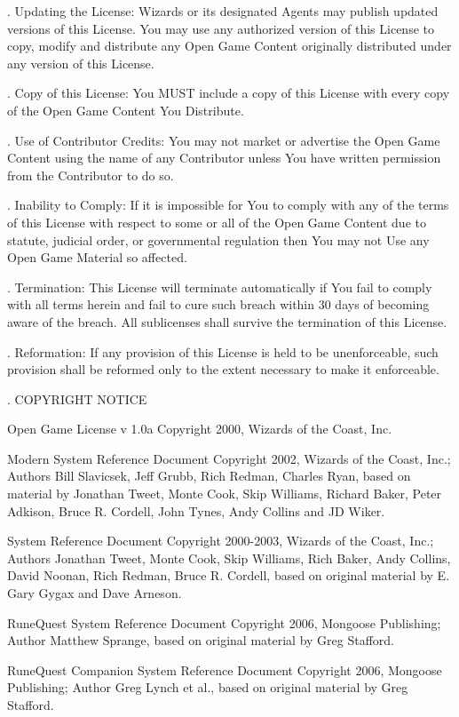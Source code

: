 \begin{scriptsize}
. Updating the License: Wizards or its designated Agents may publish updated versions of this License. You may use any authorized version of this License to copy, modify and distribute any Open Game Content originally distributed under any version of this License.

. Copy of this License: You MUST include a copy of this License with every copy of the Open Game Content You Distribute.

. Use of Contributor Credits: You may not market or advertise the Open Game Content using the name of any Contributor unless You have written permission from the Contributor to do so.

. Inability to Comply: If it is impossible for You to comply with any of the terms of this License with respect to some or all of the Open Game Content due to statute, judicial order, or governmental regulation then You may not Use any Open Game Material so affected.

. Termination: This License will terminate automatically if You fail to comply with all terms herein and fail to cure such breach within 30 days of becoming aware of the breach. All sublicenses shall survive the termination of this License.

. Reformation: If any provision of this License is held to be unenforceable, such provision shall be reformed only to the extent necessary to make it enforceable.

. COPYRIGHT NOTICE

\noindent Open Game License v 1.0a Copyright 2000, Wizards of the Coast, Inc.

\noindent Modern System Reference Document Copyright 2002, Wizards of the Coast, Inc.; Authors Bill Slavicsek, Jeff Grubb, Rich Redman, Charles Ryan, based on material by Jonathan Tweet, Monte Cook, Skip Williams, Richard Baker, Peter Adkison, Bruce R. Cordell, John Tynes, Andy Collins and JD Wiker.

\noindent System Reference Document Copyright 2000-2003, Wizards of the Coast, Inc.; Authors Jonathan Tweet, Monte Cook, Skip Williams, Rich Baker, Andy Collins, David Noonan, Rich Redman, Bruce R. Cordell, based on original material by E. Gary Gygax and Dave Arneson.

\noindent RuneQuest System Reference Document Copyright 2006, Mongoose Publishing; Author Matthew Sprange, based on original material by Greg Stafford.

\noindent RuneQuest Companion System Reference Document Copyright 2006, Mongoose Publishing; Author Greg Lynch et al., based on original material by Greg Stafford.


\end{scriptsize}
